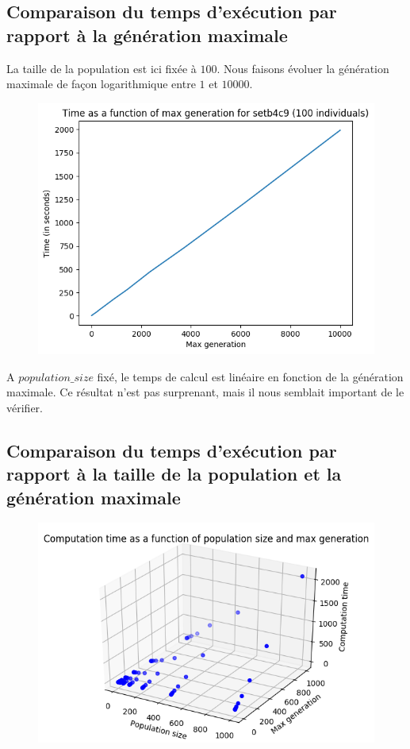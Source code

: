 \subsection{Comparaison du temps d'exécution par rapport à la génération maximale}

La taille de la population est ici fixée à $100$. Nous faisons évoluer la génération maximale de façon logarithmique entre $1$ et $10000$.

\begin{figure}[!h]
    \centering
    \includegraphics[]{report/Pictures/setb4c9_benchmarks_generation.png}
\end{figure}

A $population\_size$ fixé, le temps de calcul est linéaire en fonction de la génération maximale. Ce résultat n'est pas surprenant, mais il nous semblait important de le vérifier.

\newpage

\subsection{Comparaison du temps d'exécution par rapport à la taille de la population et la génération maximale}

\begin{figure}[!h]
    \centering
    \includegraphics[]{report/Pictures/setb4c9_benchmarks_generation_with_computation_time.png}
\end{figure}


